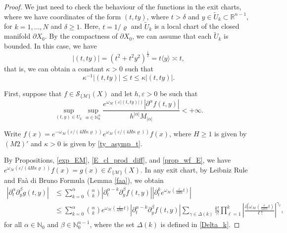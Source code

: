\documentclass[11pt,reqno]{amsart}
\numberwithin{equation}{section}
\newcommand{\R}{{\mathbb{R}}} %
\newcommand{\N}{{\mathbb{N}}} %
\newcommand{\E}{{\mathcal{E}}}
\newcommand{\M}{{\mathcal{M}}} %
\begin{document}
\begin{proof}
	We just need to check the behaviour of the functions in the exit charts, where we have coordinates of the form $(t,ty)$, where $t>\delta$ and $y \in \tilde{U}_k\subset\R^{n-1}$, for $k=1,\dots,N$ and $\delta\geq 1$. Here, $t=1/\varrho$ and $\tilde{U}_k$ is a local chart of the closed manifold $\partial X_0$. By the compactness of $\partial X_0$, we can assume that each $\tilde{U}_k$ is bounded. In this case, we have
	\[|(t,ty)| = (t^2+t^2y^2)^{\frac{1}{2}} = t\langle y\rangle \asymp t,\]
	that is, we can obtain a constant $\kappa>0$ such that
	\begin{equation}\label{ty_asymp_t}
		\kappa^{-1}|(t,ty)| \leq t \leq \kappa|(t,ty)|. 
	\end{equation}
	
	First, suppose that $f\in\mathcal{S}_{\{\M\}}(X)$ and let $h,\varepsilon>0$ be such that
	\[\sup_{(t,y)\in U_k}\sup_{\alpha\in\N_0^n}\frac{e^{\omega_\M(\varepsilon|(t,ty)|)}|\partial^\alpha f(t,y)|}{h^{|\alpha|}M_{|\alpha|}} < +\infty.\]
	
	Write $f(x) = e^{-\omega_\M(\varepsilon/(4H\kappa\varrho))} e^{\omega_\M(\varepsilon/(4H\kappa\varrho))} f(x)$, where $H\geq 1$ is given by $(M2)'$ and $\kappa>0$ is given by \eqref{ty_asymp_t}.
	
	By Propositions, \ref{exp_EM}, \ref{E_cl_prod_diff}, and \ref{prop_wf_E}, we have $e^{\omega_\M(\varepsilon/(4H\kappa\varrho))} f(x)=g(x)\in\E_{\{\M\}}(X)$. In any exit chart, by Leibniz Rule and Fa\`a di Bruno Formula (Lemma \ref{faa}), we obtain
	\begin{align*}
		|\partial_t^\alpha\partial_y^\beta g(t,y)| & \leq \sum_{k=0}^\alpha\binom{\alpha}{k}|\partial_t^{\alpha-k}\partial_y^\beta f(t,y)||\partial_t^k e^{\omega_\M\left(\tfrac{\varepsilon}{4H\kappa}t\right)}|\\
		& \leq \sum_{k=0}^\alpha\binom{\alpha}{k}e^{\omega_\M\left(\tfrac{\varepsilon}{4H\kappa}t\right)}|\partial_t^{\alpha-k}\partial_y^\beta f(t,y)| \sum_{\gamma\in\Delta(k)}\frac{k!}{\gamma!}\prod_{\ell=1}^k\left|\frac{\partial_t^\ell \omega_\M\left(\tfrac{\varepsilon}{4H\kappa}t\right)}{\ell!}\right|^{\gamma_\ell},
	\end{align*}
	for all $\alpha\in\N_0$ and $\beta\in\N_0^{n-1}$, where the set $\Delta(k)$ is defined in \eqref{Delta_k}.
	

\end{proof}
\end{document}
